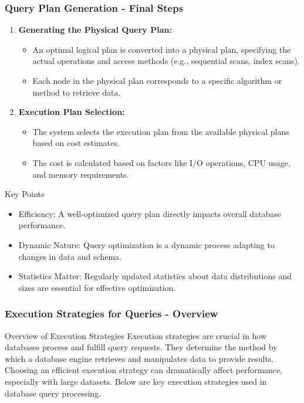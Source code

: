 \documentclass[aspectratio=169]{beamer}
\begin{document}
\begin{frame}[fragile]
    \frametitle{Query Plan Generation - Final Steps}
    \begin{enumerate}[resume]
        \item \textbf{Generating the Physical Query Plan:}
            \begin{itemize}
                \item An optimal logical plan is converted into a physical plan, specifying the actual operations and access methods (e.g., sequential scans, index scans).
                \item Each node in the physical plan corresponds to a specific algorithm or method to retrieve data.
            \end{itemize}

        \item \textbf{Execution Plan Selection:}
            \begin{itemize}
                \item The system selects the execution plan from the available physical plans based on cost estimates.
                \item The cost is calculated based on factors like I/O operations, CPU usage, and memory requirements.
            \end{itemize}
    \end{enumerate}

    \begin{block}{Key Points}
        \begin{itemize}
            \item Efficiency: A well-optimized query plan directly impacts overall database performance.
            \item Dynamic Nature: Query optimization is a dynamic process adapting to changes in data and schema.
            \item Statistics Matter: Regularly updated statistics about data distributions and sizes are essential for effective optimization.
        \end{itemize}
    \end{block}
\end{frame}

\begin{frame}[fragile]
    \frametitle{Execution Strategies for Queries - Overview}
    \begin{block}{Overview of Execution Strategies}
        Execution strategies are crucial in how databases process and fulfill query requests. They determine the method by which a database engine retrieves and manipulates data to provide results. Choosing an efficient execution strategy can dramatically affect performance, especially with large datasets. Below are key execution strategies used in database query processing.
    \end{block}
\end{frame}
\end{document}
